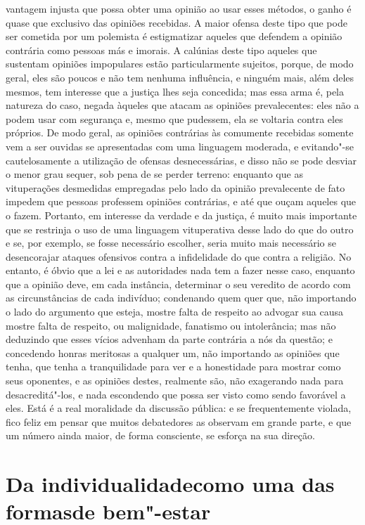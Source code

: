 vantagem injusta que possa obter uma opinião ao usar esses métodos, o
ganho é quase que exclusivo das opiniões recebidas. A maior ofensa
deste tipo que pode ser cometida por um polemista é estigmatizar
aqueles que defendem a opinião contrária como pessoas más e
imorais. A calúnias deste tipo aqueles que sustentam opiniões
impopulares estão particularmente sujeitos, porque, de modo geral, eles
são poucos e não tem nenhuma influência, e ninguém mais, além deles
mesmos, tem interesse que a justiça lhes seja concedida; mas essa arma
é, pela natureza do caso, negada àqueles que atacam as opiniões
prevalecentes: eles não a podem usar com segurança e, mesmo que
pudessem, ela se voltaria contra eles próprios. De modo geral, as
opiniões contrárias às comumente recebidas somente vem a ser ouvidas se
apresentadas com uma linguagem moderada, e evitando"-se cautelosamente
a utilização de ofensas desnecessárias, e disso não se pode desviar o
menor grau sequer, sob pena de se perder terreno: enquanto que as
vituperações desmedidas empregadas pelo lado da opinião prevalecente de
fato impedem que pessoas professem opiniões contrárias, e até que
ouçam aqueles que o fazem. Portanto, em interesse da verdade e da
justiça, é muito mais importante que se restrinja o uso de uma
linguagem vituperativa desse lado do que do outro e se, por exemplo, se
fosse necessário escolher, seria muito mais necessário se desencorajar
ataques ofensivos contra a infidelidade do que contra a religião. No
entanto, é óbvio que a lei e as autoridades nada tem a fazer nesse
caso, enquanto que a opinião deve, em cada instância, determinar o seu
veredito de acordo com as circunstâncias de cada indivíduo;
condenando quem quer que, não importando o lado do argumento que
esteja, mostre falta de respeito ao advogar sua causa mostre falta de respeito, ou
malignidade, fanatismo ou intolerância; mas não deduzindo que esses
vícios advenham da parte contrária a nós da questão; e concedendo
honras meritosas a qualquer um, não importando as opiniões que tenha,
que tenha a tranquilidade para ver e a honestidade para mostrar como
seus oponentes, e as opiniões destes, realmente são, não exagerando nada
para desacreditá"-los, e nada escondendo que possa ser visto como
sendo favorável a eles. Está é a real moralidade da discussão pública:
e se frequentemente violada, fico feliz em pensar que muitos
debatedores as observam em grande parte, e que um número ainda maior, de
forma consciente, se esforça na sua direção.

\chapter[Da individualidade]{Da individualidade\break como uma das
formas\break de bem"-estar}

